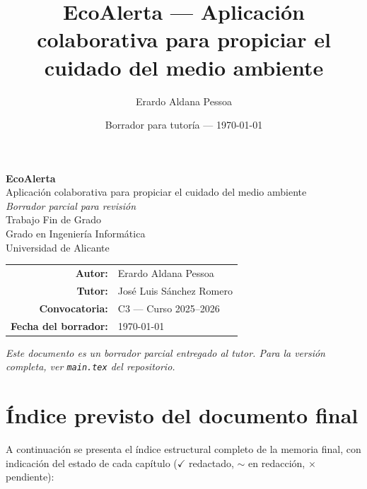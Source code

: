 \documentclass[a4paper, 12pt, twoside, openright]{report}
\title{EcoAlerta — Aplicación colaborativa para propiciar el cuidado del medio ambiente}
\author{Erardo Aldana Pessoa}
\date{Borrador para tutoría — \today}
\providecommand{\cmark}{\ensuremath{\checkmark}}
\providecommand{\pmark}{$\sim$}
\providecommand{\xmark}{$\times$}
\begin{document}
\begin{titlepage}
\centering
\vspace*{2cm}
{\sffamily\bfseries\color{uablue}\Huge EcoAlerta}\\[0.6cm]
{\sffamily\Large Aplicación colaborativa para propiciar el cuidado del medio ambiente}\\[2cm]
{\Large\textit{Borrador parcial para revisión}}\\[1cm]
{\Large Trabajo Fin de Grado}\\[0.4cm]
{\large Grado en Ingeniería Informática\\Universidad de Alicante}\\[3cm]
\begin{tabular}{rl}
\large\textbf{Autor:} & \large Erardo Aldana Pessoa \\[0.3cm]
\large\textbf{Tutor:} & \large José Luis Sánchez Romero \\[0.3cm]
\large\textbf{Convocatoria:} & \large C3 — Curso 2025--2026 \\[0.3cm]
\large\textbf{Fecha del borrador:} & \large \today \\
\end{tabular}
\vfill
{\small\textit{Este documento es un borrador parcial entregado al tutor. Para la versión completa, ver \texttt{main.tex} del repositorio.}}
\end{titlepage}

\setcounter{page}{1}



\newpage

\chapter*{Índice previsto del documento final}

A continuación se presenta el índice estructural completo de la memoria final, con indicación del estado de cada capítulo (\cmark{} redactado, \pmark{} en redacción, \xmark{} pendiente):
\end{document}
